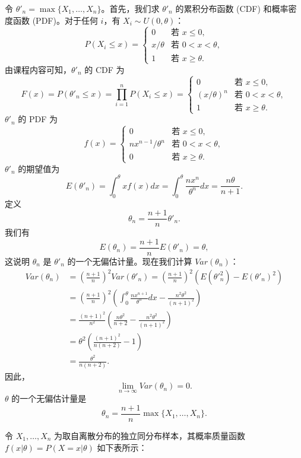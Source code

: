 \begin{questions}
\begin{solution}
令 $\theta'_n = \max\{X_1, \dots, X_n\}$。首先，我们求 $\theta'_n$ 的累积分布函数 (CDF) 和概率密度函数 (PDF)。对于任何 $i$，有 $X_i \sim U(0, \theta)$：
\[
P(X_i \le x) = 
\begin{cases} 
0 & \text{若 } x \le 0, \\
x/\theta & \text{若 } 0 < x < \theta, \\
1 & \text{若 } x \ge \theta.
\end{cases}
\]
由课程内容可知，$\theta'_n$ 的 CDF 为
\[
F(x) = P(\theta'_n \le x) = \prod_{i=1}^n P(X_i \le x) = 
\begin{cases} 
0 & \text{若 } x \le 0, \\
(x/\theta)^n & \text{若 } 0 < x < \theta, \\
1 & \text{若 } x \ge \theta.
\end{cases}
\]
$\theta'_n$ 的 PDF 为
\[
f(x) = 
\begin{cases} 
0 & \text{若 } x \le 0, \\
nx^{n-1}/\theta^n & \text{若 } 0 < x < \theta, \\
0 & \text{若 } x \ge \theta.
\end{cases}
\]
$\theta'_n$ 的期望值为
\[
E(\theta'_n) = \int_0^\theta x f(x) dx = \int_0^\theta \frac{nx^n}{\theta^n} dx = \frac{n\theta}{n + 1}.
\]
定义
\[
\theta_n = \frac{n + 1}{n} \theta'_n.
\]
我们有
\[
E(\theta_n) = \frac{n + 1}{n} E(\theta'_n) = \theta,
\]
这说明 $\theta_n$ 是 $\theta'_n$ 的一个无偏估计量。现在我们计算 $Var(\theta_n)$：
\begin{align*}
Var(\theta_n) &= \left(\frac{n + 1}{n}\right)^2 Var(\theta'_n) = \left(\frac{n + 1}{n}\right)^2 \left(E(\theta'^2_n) - E(\theta'_n)^2\right)\\
&= \left(\frac{n + 1}{n}\right)^2 \left(\int_0^\theta \frac{nx^{n+1}}{\theta^n} dx - \frac{n^2\theta^2}{(n + 1)^2}\right)\\
&= \frac{(n + 1)^2}{n^2} \left(\frac{n\theta^2}{n + 2} - \frac{n^2\theta^2}{(n + 1)^2}\right)\\
&= \theta^2 \left(\frac{(n + 1)^2}{n(n + 2)} - 1\right)\\
&= \frac{\theta^2}{n(n + 2)}.
\end{align*}
因此，
\[
\lim_{n \to \infty} Var(\theta_n) = 0.
\]
$\theta$ 的一个无偏估计量是
\[
\theta_n = \frac{n + 1}{n} \max\{X_1, \dots, X_n\}.
\]
\end{solution}

    \question
令 $X_1, \ldots, X_n$ 为取自离散分布的独立同分布样本，其概率质量函数 $f(x|\theta) = P(X = x|\theta)$ 如下表所示：


\end{questions}
